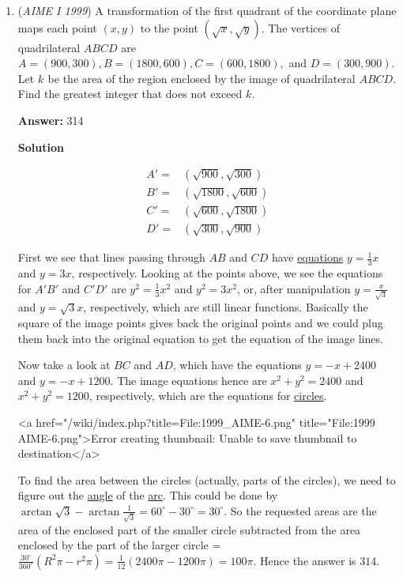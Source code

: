 \begin{enumerate}
 


	\item (\textit{AIME I 1999}) A transformation of the first quadrant of the coordinate plane maps each point $(x,y)$ to the point $(\sqrt{x},\sqrt{y}).$  The vertices of quadrilateral $ABCD$ are $A=(900,300), B=(1800,600), C=(600,1800),$ and $D=(300,900).$  Let $k_{}$ be the area of the region enclosed by the image of quadrilateral $ABCD.$  Find the greatest integer that does not exceed $k_{}.$

 \textbf{Answer: }314



\textbf{Solution}


 \begin{eqnarray*}A' = & (\sqrt {900}, \sqrt {300})\\ B' = & (\sqrt {1800}, \sqrt {600})\\ C' = & (\sqrt {600}, \sqrt {1800})\\ D' = & (\sqrt {300}, \sqrt {900}) \end{eqnarray*}

 First we see that lines passing through $AB$ and $CD$ have \href{https://artofproblemsolving.com/wiki/index.php?title=Equation}{equations} $y = \frac {1}{3}x$ and $y = 3x$, respectively. Looking at the points above, we see the equations for $A'B'$ and $C'D'$ are $y^2 = \frac {1}{3}x^2$ and $y^2 = 3x^2$, or, after manipulation $y = \frac {x}{\sqrt {3}}$ and $y = \sqrt {3}x$, respectively, which are still linear functions. Basically the square of the image points gives back the original points and we could plug them back into the original equation to get the equation of the image lines. 

 Now take a look at $BC$ and $AD$, which have the equations $y = - x + 2400$ and $y = - x + 1200$. The image equations hence are $x^2 + y^2 = 2400$ and $x^2 + y^2 = 1200$, respectively, which are the equations for \href{https://artofproblemsolving.com/wiki/index.php?title=Circle}{circles}. 

 <a href="/wiki/index.php?title=File:1999\_AIME-6.png" title="File:1999 AIME-6.png">Error creating thumbnail: Unable to save thumbnail to destination</a>

 To find the area between the circles (actually, parts of the circles), we need to figure out the \href{https://artofproblemsolving.com/wiki/index.php?title=Angle}{angle} of the \href{https://artofproblemsolving.com/wiki/index.php?title=Arc}{arc}. This could be done by $\arctan \sqrt {3} - \arctan \frac {1}{\sqrt {3}} = 60^\circ - 30^\circ = 30^\circ$. So the requested areas are the area of the enclosed part of the smaller circle subtracted from the area enclosed by the part of the larger circle = $\frac {30^\circ}{360^\circ}(R^2\pi - r^2\pi) = \frac {1}{12}(2400\pi - 1200\pi) = 100\pi$. Hence the answer is $\boxed{314}$.


\end{enumerate}
